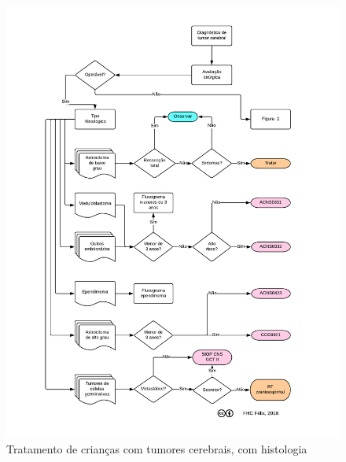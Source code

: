 \documentclass[graybox]{svmult}
\begin{document}
\begin{center}
\begin{figure}[htpb]
\includegraphics[scale=0.6,trim = 10mm 10mm 11mm 5mm,clip]{fig/fig1.pdf}
\caption{Tratamento de crianças com tumores cerebrais, com histologia}
\end{figure}
\clearpage
\begin{figure}[!htb]

\end{figure}
\end{center}
\end{document}
